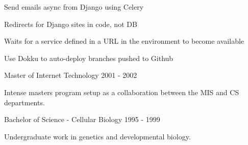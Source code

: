 \documentclass[11pt]{article} %
\begin{document}

        {}
        {Send emails async from Django using Celery}

        {}
        {Redirects for Django sites in code, not DB}

        {}
        {Waits for a service defined in a URL in the environment to become available}

        {}
        {Use Dokku to auto-deploy branches pushed to Github}


\begin{description}
\squish
{}
           {Master of Internet Technology}
           {2001 - 2002}

Intense masters program setup as a collaboration between the MIS  and CS departments.

           {Bachelor of Science - Cellular Biology}
           {1995 - 1999}

Undergraduate work in genetics and developmental biology.

\end{description}

%
%
%
%
%
\end{document}
